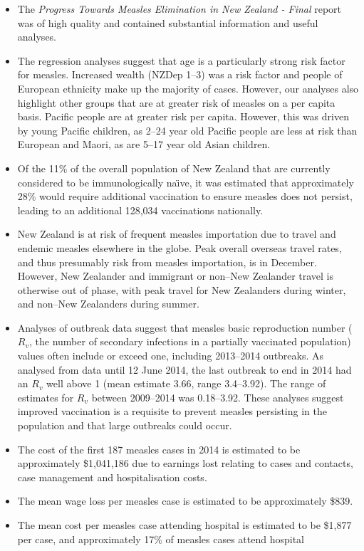 \documentclass{article}
\begin{document}
\begin{itemize}
\item The \emph {Progress Towards Measles Elimination in New Zealand - Final} report was of high quality and contained substantial information and useful analyses.
\item The regression analyses suggest that age is a particularly strong risk factor for measles.  Increased wealth (NZDep 1--3) was a risk factor and people of European ethnicity make up the majority of cases. However, our analyses also highlight other groups that are at greater risk of measles on a per capita basis. Pacific people are at greater risk per capita. However, this was driven by young Pacific children, as 2--24 year old Pacific people are less at risk than European and Maori, as are 5--17 year old Asian children.
\item Of the 11\% of the overall population of New Zealand that are currently considered to be immunologically na\"{\i}ve, it was estimated that approximately 28\% would require additional vaccination to ensure measles does not persist, leading to an additional 128,034 vaccinations nationally.
\item New Zealand is at risk of frequent measles importation due to travel and endemic measles elsewhere in the globe. Peak overall overseas travel rates, and thus presumably risk from measles importation, is in December. However, New Zealander and immigrant or non--New Zealander travel is otherwise out of phase, with peak travel for New Zealanders during winter, and non--New Zealanders during summer.
\item Analyses of outbreak data suggest that measles basic reproduction number ($R_v$, the number of secondary infections in a partially vaccinated population) values often include or exceed one, including 2013--2014 outbreaks. As analysed from data until 12 June 2014, the last outbreak to end in 2014 had an $R_v$ well above 1 (mean estimate 3.66, range 3.4--3.92). The range of estimates for $R_v$ between 2009--2014 was 0.18--3.92. These analyses suggest improved vaccination is a requisite to prevent measles persisting in the population and that large outbreaks could occur.
\item The cost of the first 187 measles cases in 2014 is estimated to be approximately \$1,041,186 due to earnings lost relating to cases and contacts, case management and hospitalisation costs.
\item The mean wage loss per measles case is estimated to be approximately \$839.
\item The mean cost per measles case attending hospital is estimated to be \$1,877 per case, and approximately 17\% of measles cases attend hospital

\end{itemize}
\end{document}
